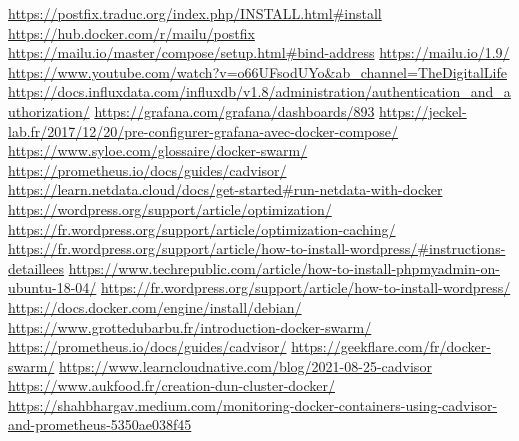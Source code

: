 \documentclass[oneside,12pt]{report}
\begin{document}
\begin{flushleft}
\url{https://postfix.traduc.org/index.php/INSTALL.html#install}\newline
\url{https://hub.docker.com/r/mailu/postfix}\newline
\url{https://mailu.io/master/compose/setup.html#bind-address}\newline
\url{https://mailu.io/1.9/}\newline
\url{https://www.youtube.com/watch?v=o66UFsodUYo&ab_channel=TheDigitalLife}\newline
\url{https://docs.influxdata.com/influxdb/v1.8/administration/authentication_and_authorization/}\newline
\url{https://grafana.com/grafana/dashboards/893}\newline
\url{https://jeckel-lab.fr/2017/12/20/pre-configurer-grafana-avec-docker-compose/}\newline
\url{https://www.syloe.com/glossaire/docker-swarm/}\newline
\url{https://prometheus.io/docs/guides/cadvisor/}\newline
\url{https://learn.netdata.cloud/docs/get-started#run-netdata-with-docker}\newline
\url{https://wordpress.org/support/article/optimization/}\newline
\url{https://fr.wordpress.org/support/article/optimization-caching/}\newline
\url{https://fr.wordpress.org/support/article/how-to-install-wordpress/#instructions-detaillees}\newline
\url{https://www.techrepublic.com/article/how-to-install-phpmyadmin-on-ubuntu-18-04/}\newline
\url{https://fr.wordpress.org/support/article/how-to-install-wordpress/}\newline
\url{https://docs.docker.com/engine/install/debian/}\newline
\url{https://www.grottedubarbu.fr/introduction-docker-swarm/}\newline
\url{https://prometheus.io/docs/guides/cadvisor/}\newline
\url{https://geekflare.com/fr/docker-swarm/}\newline
\url{https://www.learncloudnative.com/blog/2021-08-25-cadvisor}\newline
\url{https://www.aukfood.fr/creation-dun-cluster-docker/}\newline
\url{https://shahbhargav.medium.com/monitoring-docker-containers-using-cadvisor-and-prometheus-5350ae038f45}\newline

\end{flushleft}
\end{document}
